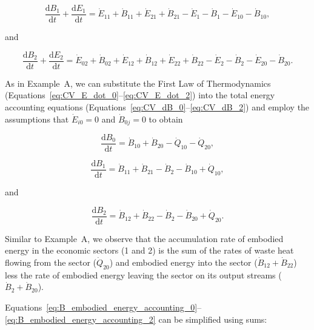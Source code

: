\begin{equation} \label{eq:CV_dB_1}
	\frac{\mathrm{d}B_{1}}{\mathrm{d}t} 
	+ \frac{\mathrm{d}E_{1}}{\mathrm{d}t} 
	= \dot{E}_{11}
	+ \dot{B}_{11}
	+ \dot{E}_{21} 
	+ \dot{B}_{21} 
	- \dot{E}_1
	- \dot{B}_1
	- \dot{E}_{10} 
	- \dot{B}_{10},
\end{equation}

\noindent and 

\begin{equation} \label{eq:CV_dB_2}
	\frac{\mathrm{d}B_{2}}{\mathrm{d}t} 
	+ \frac{\mathrm{d}E_{2}}{\mathrm{d}t} 
	= \dot{E}_{02} 
	+ \dot{B}_{02} 
	+ \dot{E}_{12}
	+ \dot{B}_{12}
	+ \dot{E}_{22} 
	+ \dot{B}_{22} 
	- \dot{E}_{2} 
	- \dot{B}_{2} 
	- \dot{E}_{20} 
	- \dot{B}_{20}.
\end{equation}

As in Example~A, we can substitute the 
First Law of Thermodynamics
(Equations~\ref{eq:CV_E_dot_0}--\ref{eq:CV_E_dot_2})
into the total energy accounting equations
(Equations~\ref{eq:CV_dB_0}--\ref{eq:CV_dB_2}) 
and employ the assumptions that 
$\dot{E}_{i0} = 0$ and
$\dot{B}_{0j} = 0$ 
to obtain

\begin{equation} \label{eq:B_embodied_energy_accounting_0}
	\frac{\mathrm{d}B_{0}}{\mathrm{d}t} 
	= \dot{B}_{10} 
	+ \dot{B}_{20} 
	- \dot{Q}_{10} 
	- \dot{Q}_{20}, 
\end{equation}

\begin{equation} \label{eq:B_embodied_energy_accounting_1}
	\frac{\mathrm{d}B_{1}}{\mathrm{d}t} 
	= \dot{B}_{11} 
	+ \dot{B}_{21}
	- \dot{B}_{2} 
	- \dot{B}_{10}
	+ \dot{Q}_{10},
\end{equation}

\noindent and

\begin{equation} \label{eq:B_embodied_energy_accounting_2}
	\frac{\mathrm{d}B_2}{\mathrm{d}t} 
	= \dot{B}_{12} 
	+ \dot{B}_{22} 
	- \dot{B}_{2}
	- \dot{B}_{20} 
	+ \dot{Q}_{20}.
\end{equation}

Similar to Example~A, we observe that the accumulation rate 
of embodied energy
in the economic sectors (1 and 2) 
is the sum of the rates of waste heat flowing from the sector 
($\dot{Q}_{20}$) and embodied energy into the sector 
($\dot{B}_{12} + \dot{B}_{22}$) 
less the rate of embodied energy leaving the sector 
on its output streams ($\dot{B}_{2} + \dot{B}_{20}$).

Equations~\ref{eq:B_embodied_energy_accounting_0}--\ref{eq:B_embodied_energy_accounting_2}
can be simplified using sums:

